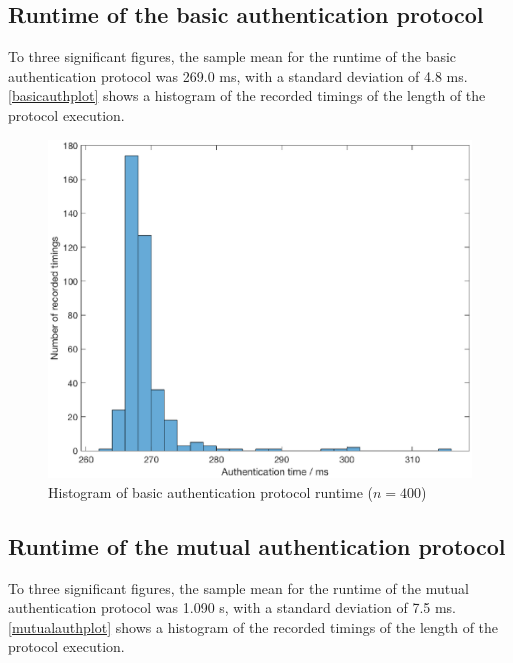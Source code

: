 \documentclass[12pt,a4paper,twoside,openright]{report}
\begin{document}
\subsection{Runtime of the basic authentication protocol}

To three significant figures, the sample mean for the runtime of the basic authentication protocol was 269.0 ms, with a standard deviation of 4.8 ms. \autoref{basicauthplot} shows a histogram of the recorded timings of the length of the protocol execution.

\begin{figure}[tbh]
\centerline{\includegraphics[scale=0.8]{figures/basicauthplot.eps}}
\caption{Histogram of basic authentication protocol runtime ($n = 400$)}
\label{basicauthplot}
\end{figure}

\subsection{Runtime of the mutual authentication protocol}

To three significant figures, the sample mean for the runtime of the mutual authentication protocol was 1.090 s, with a standard deviation of 7.5 ms. \autoref{mutualauthplot} shows a histogram of the recorded timings of the length of the protocol execution.
\end{document}
